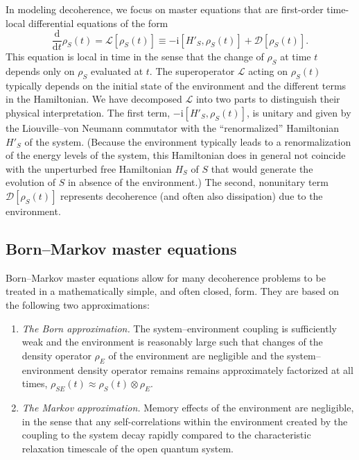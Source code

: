 \documentclass[aps,pra,reprint,amsmath,amssymb,showpacs,nofootinbib,floatfix,onecolumn,12pt]{revtex4-1}
\newcommand{\D}{\text{d}}
\newcommand{\I}{\text{i}}
\begin{document}
In modeling decoherence, we focus on master equations that are first-order time-local differential equations of the form
%
\begin{equation}
\label{eq:5vshvrgyde1}
\frac{\D}{\D t} \rho_S(t) = \mathcal{L}\left[\rho_S(t)\right] \equiv -\I  \left[ H'_S, \rho_S(t) \right] + \mathcal{D}[\rho_S(t)].
\end{equation}
%
This equation is local in time in the sense that the change of $\rho_S$ at time $t$ depends only on $\rho_S$ evaluated at $t$. The superoperator $\mathcal{L}$ acting on $\rho_S(t)$ typically depends on the initial state of the environment and the different terms in the Hamiltonian. We have decomposed $\mathcal{L}$ into two parts to distinguish their physical interpretation. The first term, $-\I  \left[ H'_S, \rho_S(t) \right]$, is unitary and given by the Liouville--von Neumann commutator with the ``renormalized'' Hamiltonian $H'_S$ of the system. (Because the environment typically leads to a renormalization of the energy levels of the system, this Hamiltonian does in general not coincide with the unperturbed free Hamiltonian $H_S$ of $S$ that would generate the evolution of $S$ in absence of the environment.) The second, nonunitary term $\mathcal{D}[\rho_S(t)]$ represents decoherence (and often also dissipation) due to the environment. 


\subsection{Born--Markov master equations}

Born--Markov master equations allow for many decoherence problems to be treated in a mathematically simple, and often closed, form. They are based on the following two approximations:

\begin{enumerate}

\item \emph{The Born approximation.} The system--environment coupling is sufficiently weak and the environment is reasonably large such that changes of the density operator $\rho_E$ of the environment are negligible and the system--environment density operator remains remains approximately factorized at all times, $\rho_{SE}(t) \approx \rho_S(t) \otimes \rho_E$.

\item \emph{The Markov approximation.}  Memory effects of the environment are negligible, in the sense that any self-correlations within the environment created
  by the coupling to the system decay rapidly compared to the characteristic relaxation timescale of the open quantum system. 

\end{enumerate}
\end{document}
